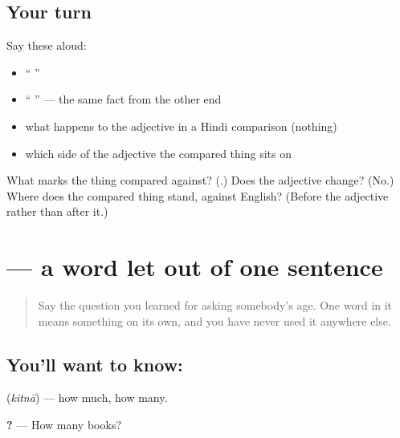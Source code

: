 \subsection*{Your turn}
Say these aloud:

\begin{itemize}
\raggedright
  \item \textquotedblleft{}    \textquotedblright{}
  \item \textquotedblleft{}    \textquotedblright{} — the same fact from the other end
  \item what happens to the adjective in a Hindi comparison (nothing)
  \item which side of the adjective the compared thing sits on
\end{itemize}

\begin{tcolorbox}[breakable,colback=teal!4,colframe=teal!35!black,title={Before you move on}]
What marks the thing compared against? (\textbf{}.) Does the adjective change? (No.) Where does the compared thing stand, against English? (Before the adjective rather than after it.)
\end{tcolorbox}
\section[\texorpdfstring{\hi{कितना} (kitnā)}{कितना (kitnā)}]{ — a word let out of one sentence}

\label{lesson:HI-C92-kitna}



\begin{quote}
Say the question you learned for asking somebody's age. One word in it means something on its own, and you have never used it anywhere else.
\end{quote}

\subsection*{You'll want to know: }
\textbf{} (\emph{kitnā}) — how much, how many.

\textbf{ ?} — How many books?

